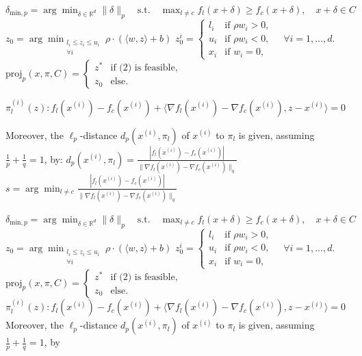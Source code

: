 $\delta_{\text{min},p} = \arg \min_{\delta \in \mathbb{R}^d} \|\delta\|_p \quad \text{s.t.} \quad \max_{l \neq c} f_l(x + \delta) \geq f_c(x + \delta), \quad x + \delta \in C$
$z_0 = \arg \min_{\substack{l_i \leq z_i \leq u_i \\ \forall i}} \rho \cdot (\langle w, z \rangle + b)$
$z_0^i = \begin{cases} 
l_i & \text{if } \rho w_i > 0, \\
u_i & \text{if } \rho w_i < 0, \\
x_i & \text{if } w_i = 0,
\end{cases}
\quad \forall i = 1, \dots, d.$
$\text{proj}_p(x, \pi, C) = \begin{cases} 
z^* & \text{if (2) is feasible}, \\
z_0 & \text{else}.
\end{cases}$

$\pi_l^{(i)}(z) : f_l(x^{(i)}) - f_c(x^{(i)}) + \langle \nabla f_l(x^{(i)}) - \nabla f_c(x^{(i)}), z - x^{(i)} \rangle = 0$

Moreover, the $\ell_p$-distance $d_p(x^{(i)}, \pi_l)$ of $x^{(i)}$ to $\pi_l$ is given, assuming $\frac{1}{p} + \frac{1}{q} = 1$, by:
$d_p(x^{(i)}, \pi_l) = \frac{|f_l(x^{(i)}) - f_c(x^{(i)})|}{\|\nabla f_l(x^{(i)}) - \nabla f_c(x^{(i)})\|_q}$
$s = \arg \min_{l \neq c} \frac{|f_l(x^{(i)}) - f_c(x^{(i)})|}{\|\nabla f_l(x^{(i)}) - \nabla f_c(x^{(i)})\|_q}$

$\delta_{\text{min},p} = \arg \min_{\delta \in \mathbb{R}^d} \|\delta\|_p \quad \text{s.t.} \quad \max_{l \neq c} f_l(x + \delta) \geq f_c(x + \delta), \quad x + \delta \in C$
$z_0 = \arg \min_{\substack{l_i \leq z_i \leq u_i \\ \forall i}} \rho \cdot (\langle w, z \rangle + b)$
$z_0^i = \begin{cases} 
l_i & \text{if } \rho w_i > 0, \\
u_i & \text{if } \rho w_i < 0, \\
x_i & \text{if } w_i = 0,
\end{cases}
\quad \forall i = 1, ..., d.
$
$\text{proj}_p(x, \pi, C) = \begin{cases} 
z^* & \text{if (2) is feasible}, \\
z_0 & \text{else}.
\end{cases}$
$\pi_l^{(i)}(z) : f_l(x^{(i)}) - f_c(x^{(i)}) + \langle \nabla f_l(x^{(i)}) - \nabla f_c(x^{(i)}), z - x^{(i)} \rangle = 0$
Moreover, the $\ell_p$-distance $d_p(x^{(i)}, \pi_l)$ of $x^{(i)}$ to $\pi_l$ is given, assuming $\frac{1}{p} + \frac{1}{q} = 1$, by

